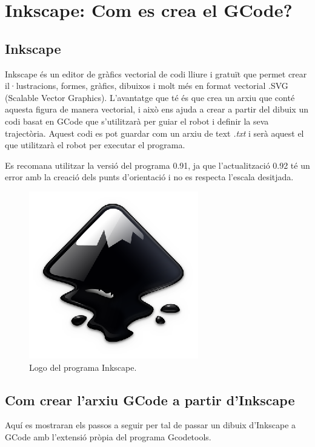 \section{Inkscape: Com es crea el GCode?}

\subsection{Inkscape}

Inkscape és un editor de gràfics vectorial de codi lliure i gratuït que permet crear il·lustracions, formes, gràfics, dibuixos i molt més en format vectorial .SVG (Scalable Vector Graphics). L'avantatge que té és que crea un arxiu que conté aquesta figura de manera vectorial, i això ens ajuda a crear a partir del dibuix un codi basat en GCode que s'utilitzarà per guiar el robot i definir la seva trajectòria. Aquest codi es pot guardar com un arxiu de text \emph{.txt} i serà aquest el que utilitzarà el robot per executar el programa.

Es recomana utilitzar la versió del programa 0.91, ja que l'actualització 0.92 té un error amb la creació dels punts d'orientació i no es respecta l'escala desitjada. 

\begin{figure}[H]
	\centering
	\includegraphics[scale=1]{inkscape-logo.eps}
	\caption{Logo del programa Inkscape.}
	\label{fig:inkscapelogo}
\end{figure}

\subsection{Com crear l'arxiu GCode a partir d'Inkscape} \label{sec:ManualInk}

Aquí es mostraran els passos a seguir per tal de passar un dibuix d'Inkscape a GCode amb l'extensió pròpia del programa Gcodetools.

